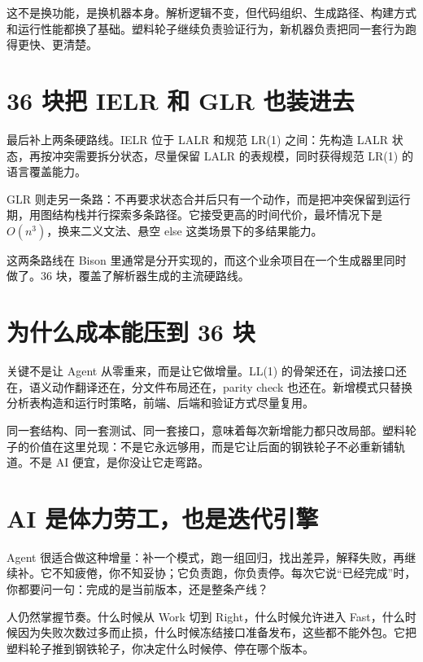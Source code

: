 这不是换功能，是换机器本身。解析逻辑不变，但代码组织、生成路径、构建方式和运行性能都换了基础。塑料轮子继续负责验证行为，新机器负责把同一套行为跑得更快、更清楚。

\section{36 块把 IELR 和 GLR 也装进去}

最后补上两条硬路线。IELR 位于 LALR 和规范 LR(1) 之间：先构造 LALR 状态，再按冲突需要拆分状态，尽量保留 LALR 的表规模，同时获得规范 LR(1) 的语言覆盖能力。

GLR 则走另一条路：不再要求状态合并后只有一个动作，而是把冲突保留到运行期，用图结构栈并行探索多条路径。它接受更高的时间代价，最坏情况下是 \(O(n^3)\)，换来二义文法、悬空 else 这类场景下的多结果能力。

这两条路线在 Bison 里通常是分开实现的，而这个业余项目在一个生成器里同时做了。36 块，覆盖了解析器生成的主流硬路线。

\section{为什么成本能压到 36 块}

关键不是让 Agent 从零重来，而是让它做增量。LL(1) 的骨架还在，词法接口还在，语义动作翻译还在，分文件布局还在，parity check 也还在。新增模式只替换分析表构造和运行时策略，前端、后端和验证方式尽量复用。

同一套结构、同一套测试、同一套接口，意味着每次新增能力都只改局部。塑料轮子的价值在这里兑现：不是它永远够用，而是它让后面的钢铁轮子不必重新铺轨道。不是 AI 便宜，是你没让它走弯路。

\section{AI 是体力劳工，也是迭代引擎}

Agent 很适合做这种增量：补一个模式，跑一组回归，找出差异，解释失败，再继续补。它不知疲倦，你不知妥协；它负责跑，你负责停。每次它说“已经完成”时，你都要问一句：完成的是当前版本，还是整条产线？

人仍然掌握节奏。什么时候从 Work 切到 Right，什么时候允许进入 Fast，什么时候因为失败次数过多而止损，什么时候冻结接口准备发布，这些都不能外包。它把塑料轮子推到钢铁轮子，你决定什么时候停、停在哪个版本。

